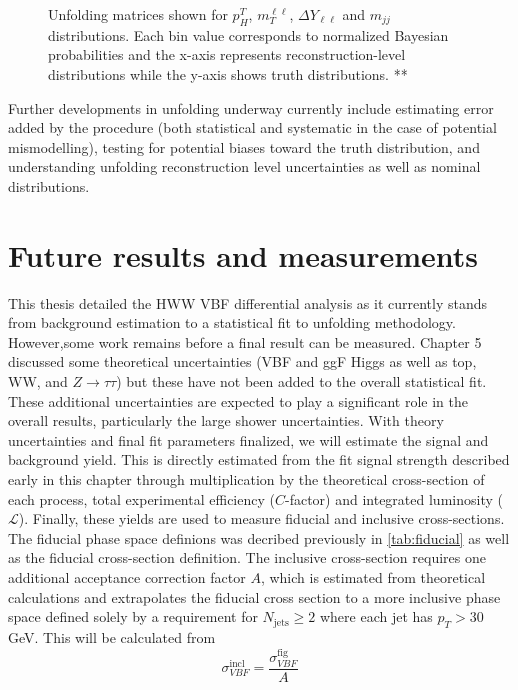 \begin{figure}[!h]
{  }%
\caption{\label{fig:unfoldingmatrices}Unfolding matrices shown for $p^T_H$, $m_T^{\ell\ell}$, $\Delta Y_{\ell\ell}$ and $m_{jj}$ distributions. Each bin value corresponds to normalized Bayesian probabilities and the x-axis represents reconstruction-level distributions while the y-axis shows truth distributions. **}
\end{figure}  

Further developments in unfolding underway currently include estimating error added by the procedure (both statistical and systematic in the case of potential mismodelling), testing for potential biases toward the truth distribution, and understanding unfolding reconstruction level uncertainties as well as nominal distributions. 

\section{Future results and measurements}

This thesis detailed the HWW VBF differential analysis as it currently stands from background estimation to a statistical fit to unfolding methodology. However,some work remains before a final result can be measured. Chapter 5 discussed some theoretical uncertainties (VBF and ggF Higgs as well as top, WW, and $Z\rightarrow \tau\tau$) but these have not been added to the overall statistical fit. These additional uncertainties are expected to play a significant role in the overall results, particularly the large shower uncertainties. With theory uncertainties and final fit parameters finalized, we will estimate the signal and background yield. This is directly estimated from the fit signal strength described early in this chapter through multiplication by the theoretical cross-section of each process, total experimental efficiency ($C$-factor) and integrated luminosity ($\mathcal{L}$). Finally, these yields are used to measure fiducial and inclusive cross-sections. The fiducial phase space definions was decribed previously in \ref{tab:fiducial} as well as the fiducial cross-section definition. The inclusive cross-section requires one additional acceptance correction factor $A$, which is estimated from theoretical calculations and extrapolates the fiducial cross section to a more inclusive phase space defined solely by a requirement for $N_{\text{jets}}\geq2$ where each jet has $p_T>30$GeV. This will be calculated from
\begin{equation}
\sigma_{VBF}^{\text{incl}} = \frac{\sigma_{VBF}^{\text{fig}}}{A}
\end{equation} 


